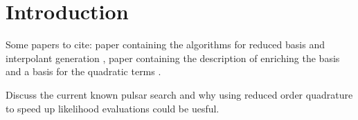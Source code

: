 \section{Introduction}

Some papers to cite: paper containing the algorithms for reduced basis and interpolant generation
\citep{Field_2014}, paper containing the description of enriching the basis and a basis for the quadratic terms
\citep{2016arXiv160408253S}.

Discuss the current known pulsar search and why using reduced order quadrature to speed up likelihood evaluations could be uesful.